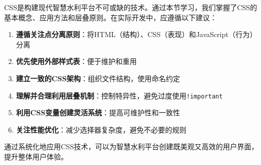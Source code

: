 CSS是构建现代智慧水利平台不可或缺的技术。通过本节学习，我们掌握了CSS的基本概念、应用方法和层叠原则。在实际开发中，应遵循以下建议：

\begin{enumerate}
\def\labelenumi{\arabic{enumi}.}
\tightlist
\item
  \textbf{遵循关注点分离原则}：将HTML（结构）、CSS（表现）和JavaScript（行为）分离
\item
  \textbf{优先使用外部样式表}：便于维护和重用
\item
  \textbf{建立一致的CSS架构}：组织文件结构，使用命名约定
\item
  \textbf{理解并合理利用层叠机制}：控制特异性，避免过度使用\passthrough{\lstinline"!important"}
\item
  \textbf{利用CSS变量创建灵活系统}：提高可维护性和一致性
\item
  \textbf{关注性能优化}：减少选择器复杂度，避免不必要的规则
\end{enumerate}

通过系统化地应用CSS技术，可以为智慧水利平台创建既美观又高效的用户界面，提升整体用户体验。
